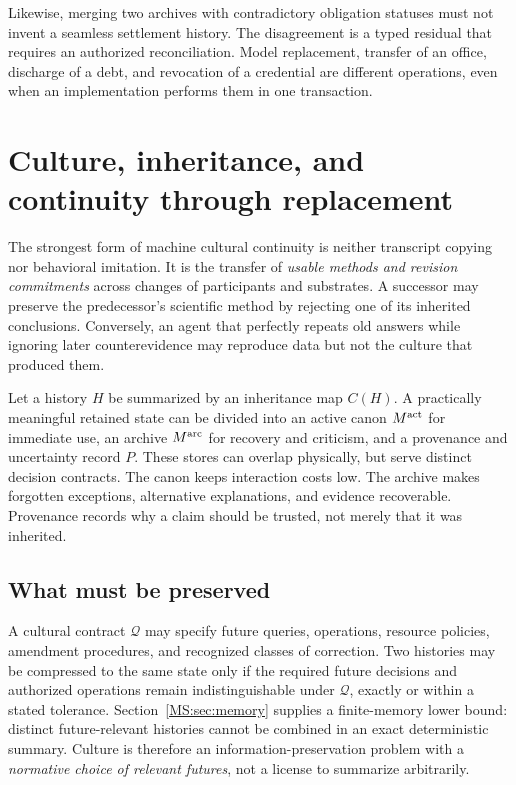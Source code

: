 Likewise, merging two archives with contradictory obligation statuses must not invent a seamless settlement history. The disagreement is a typed residual that requires an authorized reconciliation. Model replacement, transfer of an office, discharge of a debt, and revocation of a credential are different operations, even when an implementation performs them in one transaction.

\section{Culture, inheritance, and continuity through replacement}\label{MS:sec:culture}

The strongest form of machine cultural continuity is neither transcript copying nor behavioral imitation. It is the transfer of \emph{usable methods and revision commitments} across changes of participants and substrates. A successor may preserve the predecessor's scientific method by rejecting one of its inherited conclusions. Conversely, an agent that perfectly repeats old answers while ignoring later counterevidence may reproduce data but not the culture that produced them.

Let a history $H$ be summarized by an inheritance map $C(H)$. A practically meaningful retained state can be divided into an active canon $M^{\rm act}$ for immediate use, an archive $M^{\rm arc}$ for recovery and criticism, and a provenance and uncertainty record $P$. These stores can overlap physically, but serve distinct decision contracts. The canon keeps interaction costs low. The archive makes forgotten exceptions, alternative explanations, and evidence recoverable. Provenance records why a claim should be trusted, not merely that it was inherited.

\subsection{What must be preserved}

A cultural contract $\mathcal Q$ may specify future queries, operations, resource policies, amendment procedures, and recognized classes of correction. Two histories may be compressed to the same state only if the required future decisions and authorized operations remain indistinguishable under $\mathcal Q$, exactly or within a stated tolerance. Section~\ref{MS:sec:memory} supplies a finite-memory lower bound: distinct future-relevant histories cannot be combined in an exact deterministic summary. Culture is therefore an information-preservation problem with a \emph{normative choice of relevant futures}, not a license to summarize arbitrarily.

